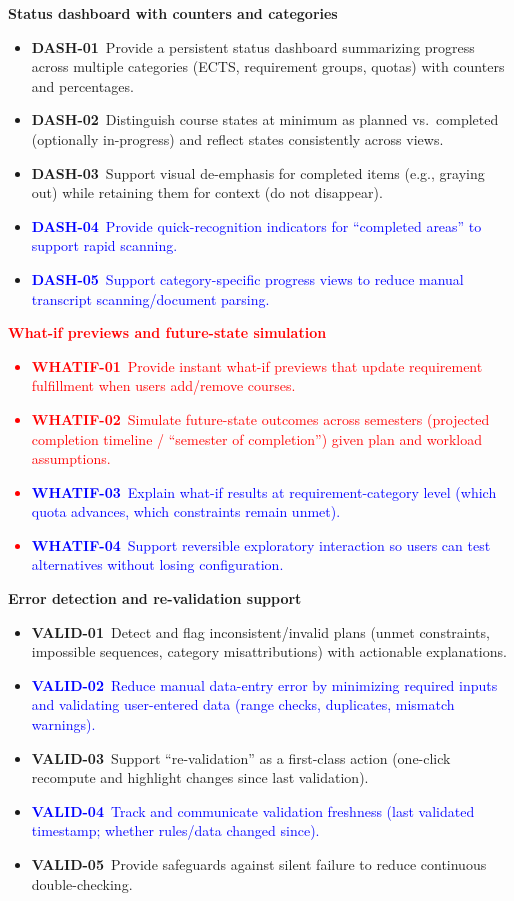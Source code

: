 \textbf{Status dashboard with counters and categories}
\begin{itemize}
  \item \textbf{DASH-01}~Provide a persistent status dashboard summarizing progress across multiple categories (ECTS, requirement groups, quotas) with counters and percentages.
  \item \textbf{DASH-02}~Distinguish course states at minimum as planned vs.\ completed (optionally in-progress) and reflect states consistently across views.
  \item \textbf{DASH-03}~Support visual de-emphasis for completed items (e.g., graying out) while retaining them for context (do not disappear).
  \item \textcolor{blue}{\textbf{DASH-04}~Provide quick-recognition indicators for “completed areas” to support rapid scanning.}
  \item \textcolor{blue}{\textbf{DASH-05}~Support category-specific progress views to reduce manual transcript scanning/document parsing.}
\end{itemize}

\textcolor{red}{\textbf{What-if previews and future-state simulation}
\begin{itemize}
  \item \textbf{WHATIF-01}~Provide instant what-if previews that update requirement fulfillment when users add/remove courses.
  \item \textbf{WHATIF-02}~Simulate future-state outcomes across semesters (projected completion timeline / “semester of completion”) given plan and workload assumptions.
  \item \textcolor{blue}{\textbf{WHATIF-03}~Explain what-if results at requirement-category level (which quota advances, which constraints remain unmet).}
  \item \textcolor{blue}{\textbf{WHATIF-04}~Support reversible exploratory interaction so users can test alternatives without losing configuration.}
\end{itemize}}

\textbf{Error detection and re-validation support}
\begin{itemize}
  \item \textbf{VALID-01}~Detect and flag inconsistent/invalid plans (unmet constraints, impossible sequences, category misattributions) with actionable explanations.
  \item \textcolor{blue}{\textbf{VALID-02}~Reduce manual data-entry error by minimizing required inputs and validating user-entered data (range checks, duplicates, mismatch warnings).}
  \item \textbf{VALID-03}~Support “re-validation” as a first-class action (one-click recompute and highlight changes since last validation).
  \item \textcolor{blue}{\textbf{VALID-04}~Track and communicate validation freshness (last validated timestamp; whether rules/data changed since).}
  \item \textbf{VALID-05}~Provide safeguards against silent failure to reduce continuous double-checking.
\end{itemize}


